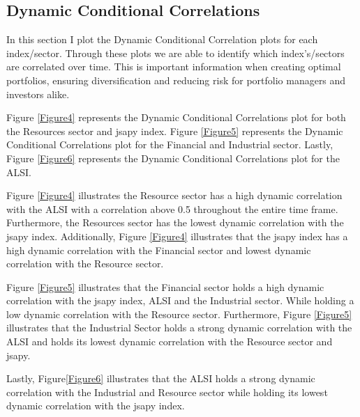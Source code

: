 \documentclass[12pt,preprint, authoryear]{elsarticle}
\numberwithin{equation}{section}
\numberwithin{figure}{section}
\numberwithin{table}{section}
\begin{document}
\hypertarget{dynamic-conditional-correlations}{%
\subsection{Dynamic Conditional
Correlations}\label{dynamic-conditional-correlations}}

In this section I plot the Dynamic Conditional Correlation plots for
each index/sector. Through these plots we are able to identify which
index's/sectors are correlated over time. This is important information
when creating optimal portfolios, ensuring diversification and reducing
risk for portfolio managers and investors alike.

Figure \ref{Figure4} represents the Dynamic Conditional Correlations
plot for both the Resources sector and jsapy index. Figure \ref{Figure5}
represents the Dynamic Conditional Correlations plot for the Financial
and Industrial sector. Lastly, Figure \ref{Figure6} represents the
Dynamic Conditional Correlations plot for the ALSI.

Figure \ref{Figure4} illustrates the Resource sector has a high dynamic
correlation with the ALSI with a correlation above 0.5 throughout the
entire time frame. Furthermore, the Resources sector has the lowest
dynamic correlation with the jsapy index. Additionally, Figure
\ref{Figure4} illustrates that the jsapy index has a high dynamic
correlation with the Financial sector and lowest dynamic correlation
with the Resource sector.

Figure \ref{Figure5} illustrates that the Financial sector holds a high
dynamic correlation with the jsapy index, ALSI and the Industrial
sector. While holding a low dynamic correlation with the Resource
sector. Furthermore, Figure \ref{Figure5} illustrates that the
Industrial Sector holds a strong dynamic correlation with the ALSI and
holds its lowest dynamic correlation with the Resource sector and jsapy.

Lastly, Figure\ref{Figure6} illustrates that the ALSI holds a strong
dynamic correlation with the Industrial and Resource sector while
holding its lowest dynamic correlation with the jsapy index.
\end{document}

